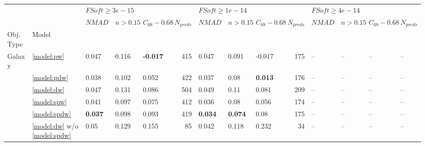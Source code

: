 \documentclass[fleqn,usenatbib]{mnras}
\begin{document}
\begin{table}
	\begin{tabular}{lllllrlllrllll}
            \hline
                &    & \multicolumn{4}{l}{$FSoft \geq 3e-15$} & \multicolumn{4}{l}{$FSoft \geq 1e-14$} & \multicolumn{4}{l}{$FSoft \geq 4e-14$} \\
                &    &             $NMAD$ &        $n>0.15$ &  $C_{68} - 0.68$ & $N_{preds}$ &             $NMAD$ &        $n>0.15$ &  $C_{68} - 0.68$ & $N_{preds}$ &             $NMAD$ &        $n>0.15$ &  $C_{68} - 0.68$ & $N_{preds}$ \\
            Obj. Type & Model &                    &                 &                  &             &                    &                 &                  &             &                    &                 &                  &             \\
            \hline
            Galaxy & \ref{model:pw} &              0.047 &           0.116 &  \textbf{-0.017} &         415 &              0.047 &           0.091 &           -0.017 &         175 &                 -- &              -- &               -- &          -- \\
                & \ref{model:pdw} &              0.038 &           0.102 &            0.052 &         422 &              0.037 &            0.08 &   \textbf{0.013} &         176 &                 -- &              -- &               -- &          -- \\
                & \ref{model:dw} &              0.047 &           0.131 &            0.086 &         504 &              0.049 &            0.11 &            0.081 &         209 &                 -- &              -- &               -- &          -- \\
                & \ref{model:spw} &              0.041 &           0.097 &            0.075 &         412 &              0.036 &            0.08 &            0.056 &         174 &                 -- &              -- &               -- &          -- \\
                & \ref{model:spdw} &     \textbf{0.037} &           0.098 &            0.093 &         419 &     \textbf{0.034} &  \textbf{0.074} &             0.08 &         175 &                 -- &              -- &               -- &          -- \\
                & \ref{model:dw} w/o \ref{model:spdw} &               0.05 &           0.129 &            0.155 &          85 &              0.042 &           0.118 &            0.232 &          34 &                 -- &              -- &               -- &          -- \\

\end{tabular}
\end{table}
\end{document}
